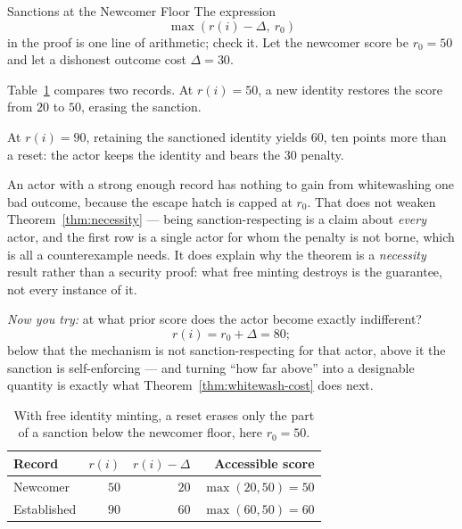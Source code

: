 \documentclass[11pt,a4paper]{article}
\theoremstyle{definition}
\begin{document}
\begin{pdexample}{Sanctions at the Newcomer Floor}
\setlength{\parskip}{4pt plus 1pt}
\label{ex:newcomer-floor}
The expression
\[
\max(r(i)-\Delta,\ r_0)
\]
in the proof is one line of arithmetic; check it. Let the
newcomer score be $r_0=50$ and let a dishonest outcome cost $\Delta=30$.

Table~\ref{tab:necessity-numbers} compares two records. At $r(i)=50$, a new
identity restores the score from $20$ to $50$, erasing the sanction.

At
$r(i)=90$, retaining the sanctioned identity yields $60$, ten points more
than a reset: the actor keeps the identity and bears the $30$ penalty.

An actor with a strong enough record
has nothing to gain from whitewashing one bad outcome, because the escape hatch is
capped at $r_0$. That does not weaken Theorem~\ref{thm:necessity} --- being
sanction-respecting is a claim about \emph{every} actor, and the first row is a single
actor for whom the penalty is not borne, which is all a counterexample needs. It
does explain why the theorem is a \emph{necessity} result rather than a security
proof: what free minting destroys is the guarantee, not every instance of it.

\emph{Now you try:} at what prior score does the actor
become exactly indifferent?
\[
r(i)=r_0+\Delta=80;
\]
below that the mechanism is not
sanction-respecting for that actor, above it the sanction is self-enforcing --- and
turning ``how far above'' into a designable quantity is exactly what
Theorem~\ref{thm:whitewash-cost} does next.
\end{pdexample}

\begin{table}[H]
\centering\small\renewcommand{\arraystretch}{1.25}
\begin{tabularx}{\textwidth}{@{}>{\raggedright\arraybackslash}X r r r@{}}
\toprule
\textbf{Record} & $r(i)$ & $r(i)-\Delta$ & \textbf{Accessible score} \\
\midrule
Newcomer & $50$ & $20$ & $\max(20,50)=50$ \\
Established & $90$ & $60$ & $\max(60,50)=60$ \\
\bottomrule
\end{tabularx}
\caption{With free identity minting, a reset erases only the part of a sanction
below the newcomer floor, here $r_0=50$.}
\label{tab:necessity-numbers}
\end{table}

\end{document}
